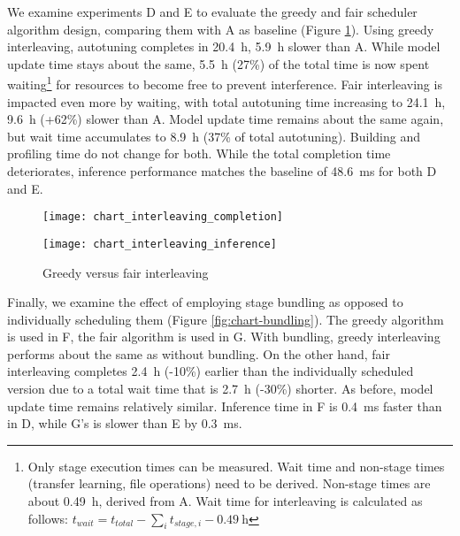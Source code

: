 We examine experiments D and E to evaluate the greedy and fair scheduler algorithm design, comparing them with A as baseline (Figure \ref{fig:chart-interleaving}). Using greedy interleaving, autotuning completes in \SI{20.4}{\hour}, \SI{5.9}{\hour} slower than A. While model update time stays about the same, \SI{5.5}{\hour} (27\%) of the total time is now spent waiting\footnote{Only stage execution times can be measured. Wait time and non-stage times (transfer learning, file operations) need to be derived. Non-stage times are about \SI{0.49}{\hour}, derived from A. Wait time for interleaving is calculated as follows: $t_{wait} = t_{total} - \sum_{i}t_{stage,i} - \SI{0.49}{\hour}$} for resources to become free to prevent interference. Fair interleaving is impacted even more by waiting, with total autotuning time increasing to \SI{24.1}{\hour}, \SI{9.6}{\hour} (+62\%) slower than A. Model update time remains about the same again, but wait time accumulates to \SI{8.9}{\hour} (37\% of total autotuning). Building and profiling time do not change for both. While the total completion time deteriorates, inference performance matches the baseline of \SI{48.6}{\milli\second} for both D and E.

\begin{figure}[t]
	\begin{minipage}[b]{.6\textwidth}
		\centering\texttt{[image: chart\_interleaving\_completion]}
		\label{fig:chart-interleaving-completion}
	\end{minipage}%
	\hfill
	\begin{minipage}[b]{.35\textwidth}
		\centering\texttt{[image: chart\_interleaving\_inference]}
		\label{fig:chart-interleaving-inference}
	\end{minipage}
	\caption[Results of greedy versus fair interleaving]{Greedy versus fair interleaving}
	\label{fig:chart-interleaving}
\end{figure}

Finally, we examine the effect of employing stage bundling as opposed to individually scheduling them (Figure \ref{fig:chart-bundling}). The greedy algorithm is used in F, the fair algorithm is used in G. With bundling, greedy interleaving performs about the same as without bundling. On the other hand, fair interleaving completes \SI{2.4}{\hour} (-10\%) earlier than the individually scheduled version due to a total wait time that is \SI{2.7}{\hour} (-30\%) shorter. As before, model update time remains relatively similar. Inference time in F is \SI{0.4}{\milli\second} faster than in D, while G's is slower than E by \SI{0.3}{\milli\second}.

